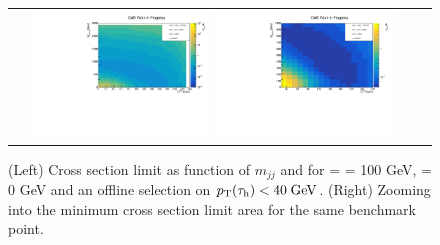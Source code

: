 \begin{figure}[tbh!]
	\centering
	\begin{tabular}{cc}
		\includegraphics[width=0.45\textwidth]{analysis/pics/JetInvMass_vs_MET_xsec_chi100_lsp000_taupt40.pdf}
		\includegraphics[width=0.45\textwidth]{analysis/pics/JetInvMass_vs_MET_xsec_chi100_lsp000_taupt40_zoom.pdf} 		
	\end{tabular}
	\caption{(Left) Cross section limit as function of $m_{jj}$ and \met for \charginopm = \neutralinotwo = 100 GeV, \neutralinoone = 0 GeV and an offline selection on $p_{\text{T}}(\tau_{\text{h}}) <  40\;\text{Ge}\kern-0.06667em\text{V}$. (Right) Zooming into the minimum cross section limit area for the same benchmark point.}
	\label{fig::JetInvMass_vs_MET_xsec_chi100_lsp000_taupt40}
\end{figure}

